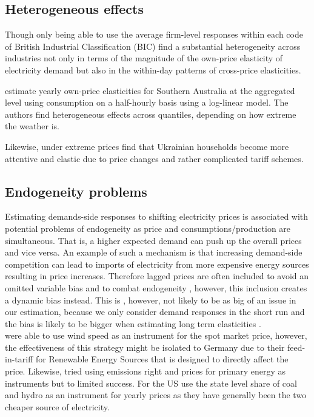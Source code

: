 
\subsection{Heterogeneous effects}
\label{subsec:b_heterogeneity}
Though only being able to use the average firm-level responses within each code of British Industrial Classification (BIC) \citet{patrick2001estimating} find a substantial heterogeneity across industries not only in terms of the magnitude of the own-price elasticity of electricity demand but also in the within-day patterns of cross-price elasticities. %
\par
\citet{fan2011price} estimate yearly own-price elasticities for Southern Australia at the aggregated level using consumption on a half-hourly basis using a log-linear model. The authors find heterogeneous effects across quantiles, depending on how extreme the weather is.
\par
Likewise, under extreme prices \citet{alberini2019response} find that Ukrainian households become more attentive and elastic due to price changes and rather complicated tariff schemes.

\subsection{Endogeneity problems}
\label{subsec:b_endogeneity}
Estimating demands-side responses to shifting electricity prices is associated with potential problems of endogeneity as price and consumptions/production are simultaneous. That is, a higher expected demand can push up the overall prices and vice versa. An example of such a mechanism is that increasing demand-side competition can lead to imports of electricity from more expensive energy sources \citep{burke2017price} resulting in price increases.  Therefore lagged prices are often included to avoid an omitted variable bias and to combat endogeneity \citep{lijesen2007real}, however, this inclusion creates a dynamic bias instead. This is , however, not likely to be as big of an issue in our estimation,  because we only consider demand responses in the short run and the bias is likely to be bigger when estimating long term elasticities \citep{okajima2013estimation}. %
\medskip \\
\citet{bonte2015price} were able to use wind speed as an instrument for the spot market price, however, the effectiveness of this strategy might be isolated to Germany due to their feed-in-tariff for Renewable Energy Sources that is designed to directly affect the price. Likewise, \citet{graf2013measuring} tried using emissions right and prices for primary energy as instruments but to limited success. For the US \citet{burke2017price} use the state level share of coal and hydro as an instrument for yearly prices as they have generally been the two cheaper source of electricity.

